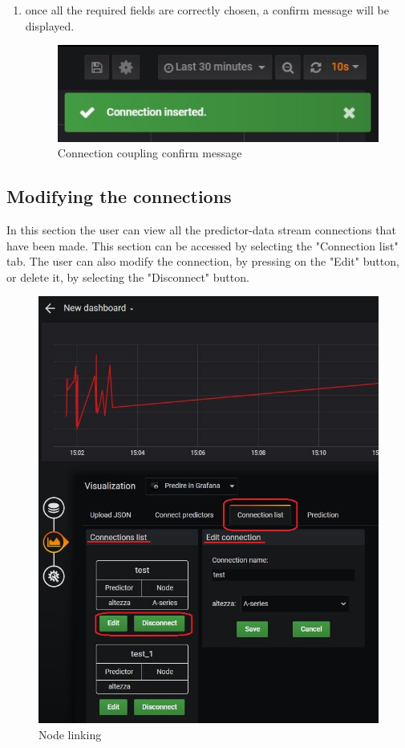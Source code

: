 \begin{enumerate}
\begin{enumerate}
\item once all the required fields are correctly chosen, a confirm message will be displayed. 

\begin{figure}[H]
\centering
\includegraphics[scale=0.60]{img/plug-in/plugin_5.JPG}
\caption{Connection coupling confirm message}
\end{figure}

\end{enumerate} 


\end{enumerate}



\subsection{Modifying the connections}
In this section the user can view all the predictor-data stream connections that have been made. This section can be accessed by selecting the "Connection list" tab.
The user can also modify the connection, by pressing on the "Edit" button, or delete it, by selecting the "Disconnect" button.

\begin{figure}[H]
\centering
\includegraphics[scale=0.75]{img/plug-in/plugin_6.JPG}
\caption{Node linking}
\end{figure}


